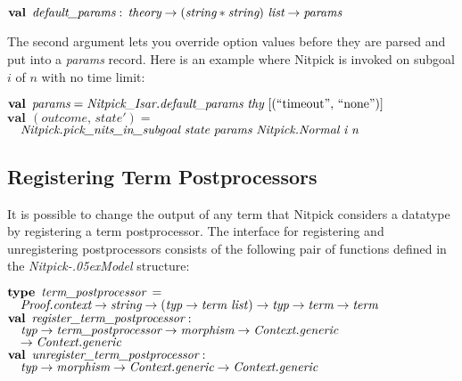 \documentclass[a4paper,12pt]{article}
\renewcommand\_{\hbox{\textunderscore\kern-.05ex}}
\begin{document}
\prew
$\textbf{val}\,~\textit{default\_params} :\,
\textit{theory} \rightarrow (\textit{string} * \textit{string})~\textit{list} \rightarrow \textit{params}$
\postw

The second argument lets you override option values before they are parsed and
put into a \textit{params} record. Here is an example where Nitpick is invoked
on subgoal $i$ of $n$ with no time limit:

\prew
$\textbf{val}\,~\textit{params} = \textit{Nitpick\_Isar.default\_params}~\textit{thy}~[(\textrm{``}\textrm{timeout\/}\textrm{''},\, \textrm{``}\textrm{none}\textrm{''})]$ \\
$\textbf{val}\,~(\textit{outcome},\, \textit{state}') = {}$ \\
$\hbox{}\quad\textit{Nitpick.pick\_nits\_in\_subgoal}~\textit{state}~\textit{params}~\textit{Nitpick.Normal}~\textit{i}~\textit{n}$
\postw

\let\antiq=\textrm

\subsection{Registering Term Postprocessors}
\label{registering-term-postprocessors}

It is possible to change the output of any term that Nitpick considers a
datatype by registering a term postprocessor. The interface for registering and
unregistering postprocessors consists of the following pair of functions defined
in the \textit{Nitpick\_Model} structure:

\prew
$\textbf{type}\,~\textit{term\_postprocessor}\,~{=} {}$ \\
$\hbox{}\quad\textit{Proof.context} \rightarrow \textit{string} \rightarrow (\textit{typ} \rightarrow \textit{term~list\/}) \rightarrow \textit{typ} \rightarrow \textit{term} \rightarrow \textit{term}$ \\
$\textbf{val}\,~\textit{register\_term\_postprocessor} : {}$ \\
$\hbox{}\quad\textit{typ} \rightarrow \textit{term\_postprocessor} \rightarrow \textit{morphism} \rightarrow \textit{Context.generic}$ \\
$\hbox{}\quad{\rightarrow}\; \textit{Context.generic}$ \\
$\textbf{val}\,~\textit{unregister\_term\_postprocessor} : {}$ \\
$\hbox{}\quad\textit{typ} \rightarrow \textit{morphism} \rightarrow \textit{Context.generic} \rightarrow \textit{Context.generic}$
\postw
\end{document}
